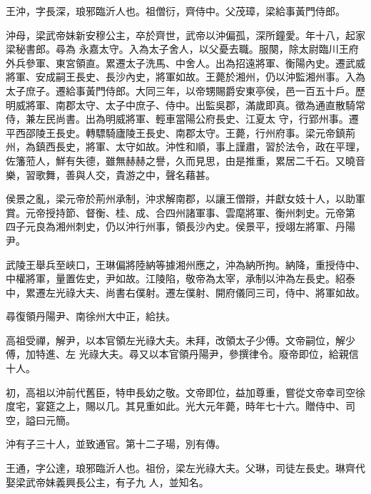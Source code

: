 
\begin{pinyinscope}

 王沖，字長深，琅邪臨沂人也。祖僧衍，齊侍中。父茂璋，梁給事黃門侍郎。



 沖母，梁武帝妹新安穆公主，卒於齊世，武帝以沖偏孤，深所鐘愛。年十八，起家梁秘書郎。尋為
 永嘉太守。入為太子舍人，以父憂去職。服闋，除太尉臨川王府外兵參軍、東宮領直。累遷太子洗馬、中舍人。出為招遠將軍、衡陽內史。遷武威將軍、安成嗣王長史、長沙內史，將軍如故。王薨於湘州，仍以沖監湘州事。入為太子庶子。遷給事黃門侍郎。大同三年，以帝甥賜爵安東亭侯，邑一百五十戶。歷明威將軍、南郡太守、太子中庶子、侍中。出監吳郡，滿歲即真。徵為通直散騎常侍，兼左民尚書。出為明威將軍、輕車當陽公府長史、江夏太
 守，行郢州事。遷平西邵陵王長史。轉驃騎廬陵王長史、南郡太守。王薨，行州府事。梁元帝鎮荊州，為鎮西長史，將軍、太守如故。沖性和順，事上謹肅，習於法令，政在平理，佐籓蒞人，鮮有失德，雖無赫赫之譽，久而見思，由是推重，累居二千石。又曉音樂，習歌舞，善與人交，貴游之中，聲名藉甚。



 侯景之亂，梁元帝於荊州承制，沖求解南郡，以讓王僧辯，并獻女妓十人，以助軍賞。元帝授持節、督衡、桂、成、合四州諸軍事、雲麾將軍、衡州刺史。元帝第
 四子元良為湘州刺史，仍以沖行州事，領長沙內史。侯景平，授翊左將軍、丹陽尹。



 武陵王舉兵至峽口，王琳偏將陸納等據湘州應之，沖為納所拘。納降，重授侍中、中權將軍，量置佐史，尹如故。江陵陷，敬帝為太宰，承制以沖為左長史。紹泰中，累遷左光祿大夫、尚書右僕射。遷左僕射、開府儀同三司，侍中、將軍如故。



 尋復領丹陽尹、南徐州大中正，給扶。



 高祖受禪，解尹，以本官領左光祿大夫。未拜，改領太子少傅。文帝嗣位，解少傅，加特進、左
 光祿大夫。尋又以本官領丹陽尹，參撰律令。廢帝即位，給親信十人。



 初，高祖以沖前代舊臣，特申長幼之敬。文帝即位，益加尊重，嘗從文帝幸司空徐度宅，宴筵之上，賜以几。其見重如此。光大元年薨，時年七十六。贈侍中、司空，謚曰元簡。



 沖有子三十人，並致通官。第十二子瑒，別有傳。



 王通，字公達，琅邪臨沂人也。祖份，梁左光祿大夫。父琳，司徒左長史。琳齊代娶梁武帝妹義興長公主，有子九
 人，並知名。




\end{pinyinscope}
